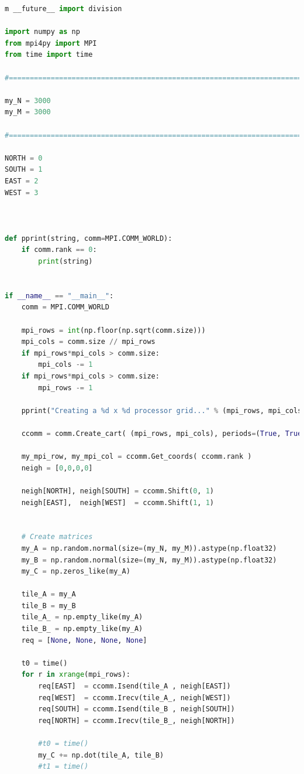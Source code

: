 \documentclass[10pt,t]{beamer}
\begin{document}
\begin{frame}
\begin{lstlisting}[language=Python,basicstyle=\tiny\ttfamily]
m __future__ import division

import numpy as np
from mpi4py import MPI
from time import time

#=============================================================================#

my_N = 3000
my_M = 3000

#=============================================================================#

NORTH = 0
SOUTH = 1
EAST = 2
WEST = 3



def pprint(string, comm=MPI.COMM_WORLD):
    if comm.rank == 0:
        print(string)


if __name__ == "__main__":
    comm = MPI.COMM_WORLD

    mpi_rows = int(np.floor(np.sqrt(comm.size)))
    mpi_cols = comm.size // mpi_rows
    if mpi_rows*mpi_cols > comm.size:
        mpi_cols -= 1
    if mpi_rows*mpi_cols > comm.size:
        mpi_rows -= 1

    pprint("Creating a %d x %d processor grid..." % (mpi_rows, mpi_cols) )

    ccomm = comm.Create_cart( (mpi_rows, mpi_cols), periods=(True, True), reorder=True)

    my_mpi_row, my_mpi_col = ccomm.Get_coords( ccomm.rank )
    neigh = [0,0,0,0]

    neigh[NORTH], neigh[SOUTH] = ccomm.Shift(0, 1)
    neigh[EAST],  neigh[WEST]  = ccomm.Shift(1, 1)


    # Create matrices
    my_A = np.random.normal(size=(my_N, my_M)).astype(np.float32)
    my_B = np.random.normal(size=(my_N, my_M)).astype(np.float32)
    my_C = np.zeros_like(my_A)

    tile_A = my_A
    tile_B = my_B
    tile_A_ = np.empty_like(my_A)
    tile_B_ = np.empty_like(my_A)
    req = [None, None, None, None]

    t0 = time()
    for r in xrange(mpi_rows):
        req[EAST]  = ccomm.Isend(tile_A , neigh[EAST])
        req[WEST]  = ccomm.Irecv(tile_A_, neigh[WEST])
        req[SOUTH] = ccomm.Isend(tile_B , neigh[SOUTH])
        req[NORTH] = ccomm.Irecv(tile_B_, neigh[NORTH])

        #t0 = time()
        my_C += np.dot(tile_A, tile_B)
        #t1 = time()


\end{lstlisting}
\end{frame}
\end{document}
